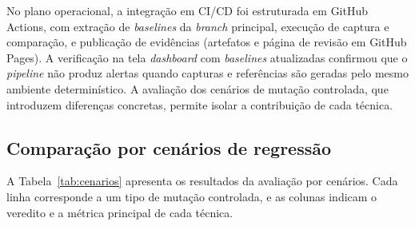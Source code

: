 \documentclass{UNESC}
\begin{document}
No plano operacional, a integração em CI/CD foi estruturada em GitHub Actions, com extração de \emph{baselines} da \emph{branch} principal, execução de captura e comparação, e publicação de evidências (artefatos e página de revisão em GitHub Pages). A verificação na tela \textit{dashboard} com \emph{baselines} atualizadas confirmou que o \emph{pipeline} não produz alertas quando capturas e referências são geradas pelo mesmo ambiente determinístico. A avaliação dos cenários de mutação controlada, que introduzem diferenças concretas, permite isolar a contribuição de cada técnica.



\subsection{Comparação por cenários de regressão}
A Tabela~\ref{tab:cenarios} apresenta os resultados da avaliação por cenários. Cada linha corresponde a um tipo de mutação controlada, e as colunas indicam o veredito e a métrica principal de cada técnica.
\end{document}
